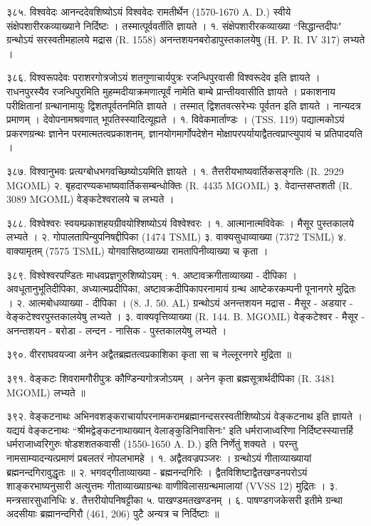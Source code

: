 ३८५. विश्ववेदः
आनन्ददेवशिष्योऽयं विश्ववेदः रामतीर्थेन (1570-1670 A. D.) स्वीये संक्षेपशारीरकव्याख्याने निर्दिष्टः । तस्मात्पूर्ववर्तीति ज्ञायते ।
१. संक्षेपशारीरकव्याख्या ``सिद्धान्तदीपः" ग्रन्थोऽयं सरस्वतीमहालये मद्रास (R. 1558) अनन्तशयनबरोडापुस्तकालयेषु (H. P. R. IV 317) लभ्यते ।

३८६. विश्वरूपदेवः
पराशरगोत्रजोऽयं शतगुणाचार्यपुत्रः रजन्धिपुरवासी विश्वरूदेव इति ज्ञायते । राधनपुरस्यैव रजन्धिपुरमिति मुहम्मदीयाक्रमणात्पूर्वं नामेति बाम्बे प्रान्तीयवासीति ज्ञायते । प्रकाशनाय परीक्षितानां ग्रन्थानामायुः द्विशतपूर्वतनमिति ज्ञायते । तस्मात् द्विशतवत्सरेभ्यः पूर्वतन इति ज्ञायते । नान्यदत्र प्रमाणम् । देवोपनामश्रवणात् भूपतिस्स्यादित्यूह्यते ।
१. विवेकमार्ताण्डः । (TSS. 119) पद्यात्मकोऽयं प्रकरणग्रन्थः ज्ञानेन परमात्मतत्वप्रकाशनम्, ज्ञानयोगमार्गोपदेशेन मोक्षापरपर्यायाद्वैतत्वप्राप्त्युपायं च प्रतिपादयति । 

३८७. विश्वानुभवः 
प्रत्यग्बोधभगवच्छिष्योऽयमिति ज्ञायते ।
१. तैत्तरीयभाष्यवार्तिकसङ्गतिः (R. 2929 MGOML)
२. बृहदारण्यकभाष्यवार्तिकसम्बन्धोक्तिः (R. 4435 MGOML)
३. वेदान्तसप्तशती (R. 3089 MGOML) वेङ्कटेश्वरालये च लभ्यते ।

३८८. विश्वेश्वरः
स्वयम्प्रकाशहयग्रीवयोश्शिष्योऽयं विश्वेश्वरः ।
१. आत्मानात्मविवेकः । मैसूर पुस्तकालये लभ्यते ।
२. गोपालतापिन्युपनिषद्दीपिका (1474 TSML)
३. वाक्यसुधाव्याख्या (7372 TSML)
४. वाक्यामृतम् (7575 TSML) योगवासिष्ठव्याख्या रामतापिनीव्याख्या च कृता ।

३८९. विश्वेश्वरपण्डितः
माधवप्रज्ञगुरुशिष्योऽयम् :
१. अष्टावक्रगीताव्याख्या - दीपिका । अवधूतानुभूतिदीपिका, अध्यात्मप्रदीपिका, अष्टावक्रदीपिकापरनामायं ग्रन्थ आष्टेकरकम्पनी पूनानगरे मुद्रितः ।
२. आत्मबोधव्याख्या - दीपिका । (8. J. 50. AL) ग्रन्थोऽयं अनन्तशयन मद्रास - मैसूर - अडयार - वेङ्कटेश्वरपुस्तकालयेषु लभ्यते ।
३. वाक्यवृत्तिव्याख्या (R. 144. B. MGOML) वेङ्कटेश्वर - मैसूर - अनन्तशयन - बरोडा - लन्दन - नासिक - पुस्तकालयेषु लभ्यते ।

३९०. वीरराघवयज्वा 
अनेन अद्वैतब्रह्मतत्वप्रकाशिका कृता सा च नेल्लूरनगरे मुद्रिता ॥

३९१. वेङ्कटः
शिवरामगौरीपुत्रः कौण्डिन्यगोत्रजोऽयम् । अनेन कृता ब्रह्मसूत्रार्थदीपिका (R. 3481 MGOML) लभ्यते ॥

३९२. वेङ्कटनाथः
अभिनवशङ्कराचार्यापरनामकरामब्रह्मानन्दसरस्वतीशिष्योऽयं वेङ्कटनाथ इति ज्ञायते । यद्ययं वेङ्कटनाथः ``श्रीमद्वेङ्कटनाथाख्यान् वेलाङ्कुडिनिवासिनः" इति धर्मराजाध्वरिणा निर्दिष्टस्स्यात्तर्हि धर्मराजाध्वरिगुरुः षोडशशतकवासी (1550-1650 A. D.) इति निर्णेतुं शक्यते । परन्तु नामसाम्यादन्यत्प्रमाणं प्रबलतरं नोपलभामहे ।
१. अद्वैतवज्रपञ्जरः । ग्रन्थोऽयं गीताव्याख्यायां ब्रह्मनन्दगिरावुद्धृतः ॥
२. भगवद्गीताव्याख्या - ब्रह्मनन्दगिरिः । द्वैतविशिष्टाद्वैतखण्डनपरोऽयं शाङ्करभाष्यनुसारी अत्युत्तमः गीताव्याख्याग्रन्थः वाणीविलासग्रन्थमालायां (VVSS 12) मुद्रितः ।
३. मन्त्रसारसुधानिधिः ४. तैत्तरीयोपनिषट्टीका ५. पाखण्डमतखण्डनम् ।
६. पाषण्डगजकेसरी इतीमे ग्रन्था अदसीयाः ब्रह्मानन्दगिरौ (461, 206) पुटै अन्यत्र च निर्दिष्टाः ॥

